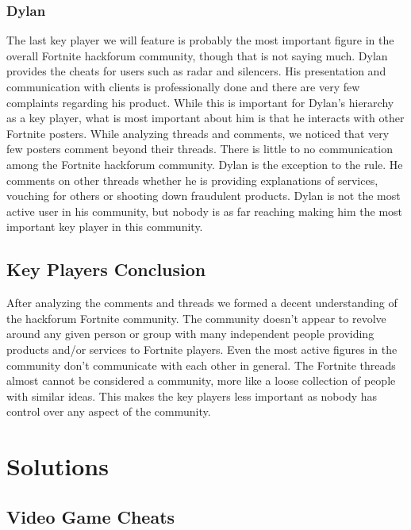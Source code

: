 \documentclass[sigconf]{acmart}
\begin{document}
\subsubsection{Dylan}
The last key player we will feature is probably the most important figure in the overall Fortnite hackforum community, though that is not saying much. Dylan provides the cheats for users such as radar and silencers. His presentation and communication with clients is professionally done and there are very few complaints regarding his product. While this is important for Dylan’s hierarchy as a key player, what is most important about him is that he interacts with other Fortnite posters. While analyzing threads and comments, we noticed that very few posters comment beyond their threads. There is little to no communication among the Fortnite hackforum community. Dylan is the exception to the rule. He comments on other threads whether he is providing explanations of services, vouching for others or shooting down fraudulent products. Dylan is not the most active user in his community, but nobody is as far reaching making him the most important key player in this community.

\subsection{Key Players Conclusion}
After analyzing the comments and threads we formed a decent understanding of the hackforum Fortnite community. The community doesn’t appear to revolve around any given person or group with many independent people providing products and/or services to Fortnite players. Even the most active figures in the community don’t communicate with each other in general. The Fortnite threads almost cannot be considered a community, more like a loose collection of people with similar ideas. This makes the key players less important as nobody has control over any aspect of the community.


\section{Solutions}
\subsection{Video Game Cheats}
\end{document}
